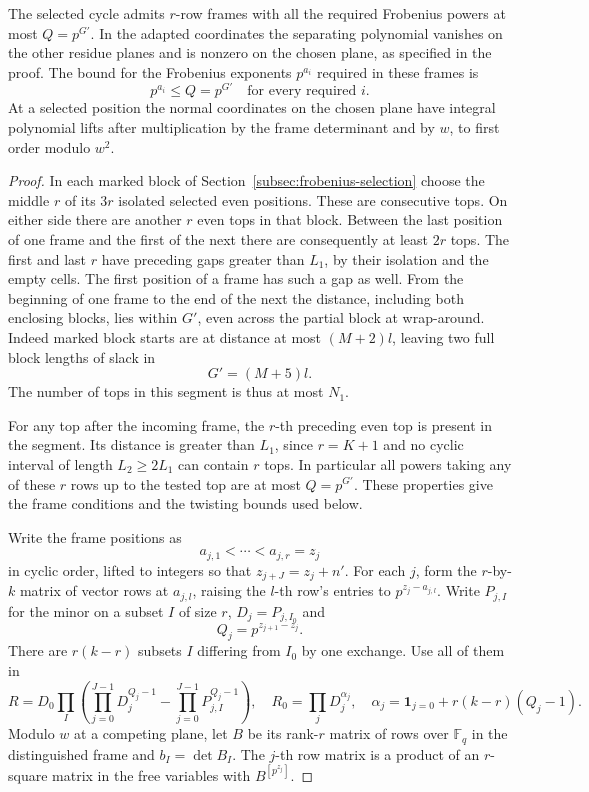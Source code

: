 \begin{lemma}
The selected cycle admits \(r\)-row frames with all the required
Frobenius powers at most \(Q=p^{G'}\). In the adapted coordinates the separating polynomial vanishes on the other residue planes and is nonzero on the chosen plane, as specified in the proof. The bound for the Frobenius exponents \(p^{a_i}\) required in these frames is
\[
 p^{a_i}\le Q=p^{G'}\quad\text{for every required }i.
\]
 At a selected position the normal
coordinates on the chosen plane have integral polynomial lifts
after multiplication by the frame determinant and by \(w\),
to first order modulo \(w^2\).
\end{lemma}
\begin{proof}
In each marked block of Section~\ref{subsec:frobenius-selection}
choose the middle \(r\) of its \(3r\) isolated selected even
positions. These are consecutive tops. On either side there are
another \(r\) even tops in that block. Between the last position
of one frame and the first of the next there are consequently at
least \(2r\) tops. The first and last \(r\) have preceding gaps
greater than \(L_1\), by their isolation and the empty cells.
The first position of a frame has such a gap as well. From the
beginning of one frame to the end of the next the distance,
including both enclosing blocks, lies within \(G'\), even across
the partial block at wrap-around. Indeed marked block starts
are at distance at most \((M+2)l\), leaving two full block
lengths of slack in
\[
 G'=(M+5)l.
\]
The number of tops in
this segment is thus at most \(N_1\).

For any top after the
incoming frame, the \(r\)-th preceding even top is present in
the segment. Its distance is greater than \(L_1\), since
\(r=K+1\) and no cyclic interval of length \(L_2\ge2L_1\)
can contain \(r\) tops. In particular all powers taking any of
these \(r\) rows up to the tested top are at most \(Q=p^{G'}\).
These properties give the frame conditions and the twisting bounds used below.

Write the frame positions as
\[
 a_{j,1}<\cdots< a_{j,r}=z_j
\]
in cyclic order, lifted to integers so that
\(z_{j+J}=z_j+n'\). For each \(j\), form the \(r\)-by-\(k\)
matrix of vector rows at \(a_{j,l}\), raising the \(l\)-th row's
entries to \(p^{z_j-a_{j,l}}\). Write \(P_{j,I}\) for the
minor on a subset \(I\) of size \(r\), \(D_j=P_{j,I_0}\) and
\[
 Q_j=p^{z_{j+1}-z_j}.
\]
There are \(r(k-r)\) subsets \(I\)
differing from \(I_0\) by one exchange. Use all of them in
\[
 R=D_0\prod_I\left(\prod_{j=0}^{J-1}D_j^{Q_j-1}
             -\prod_{j=0}^{J-1}P_{j,I}^{Q_j-1}\right),\quad
 R_0=\prod_j D_j^{\alpha_j},\quad
 \alpha_j=\mathbf1_{j=0}+r(k-r)(Q_j-1).
\]
Modulo \(w\) at a competing plane, let \(B\) be its rank-\(r\)
matrix of rows over \(\mathbb F_q\) in the distinguished frame
and \(b_I=\det B_I\). The \(j\)-th row matrix is a product of
an \(r\)-square matrix in the free variables with \(B^{[p^{z_j}]}\).


\end{proof}
